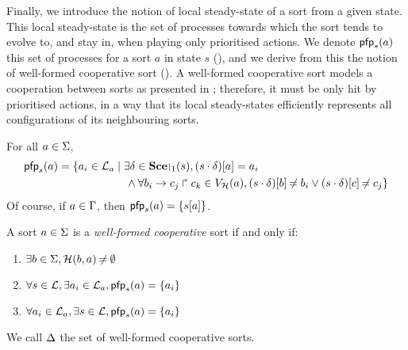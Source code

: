 Finally, we introduce the notion of local steady-state of a sort from a given state.
This local steady-state is the set of processes towards which the sort tends to evolve to, and stay in, when playing only prioritised actions.
We denote $\mathsf{pfp}_s(a)$ this set of processes for a sort $a$ in state $s$ (),
and we derive from this the notion of well-formed cooperative sort ().
A well-formed cooperative sort models a cooperation between sorts as presented in ;
therefore, it must be only hit by prioritised actions,
in a way that its local steady-states efficiently represents all configurations of its neighbouring sorts.
\begin{definition}[$\pfp : \PHs \rightarrow \powerset(\PHproc)$]
\label{def:pfp}
  For all $a \in \Sigma$,
  \begin{align*}
    \pfp_s(a) = \{ a_i \in \PHl_a &\mid \exists \delta \in \restriction{\Sce}{1}(s), \PHget{(s \PHplay \delta)}{a} = a_i \\
    & \quad \wedge \forall \PHhit{b_i}{c_j}{c_k} \in \Vh(a), \PHget{(s \PHplay \delta)}{b} \neq b_i \vee \PHget{(s \PHplay \delta)}{c} \neq c_j \}
  \end{align*}
  Of course, if $a \in \Gamma$, then $\mathsf{pfp}_s(a) = \{ {s[a]} \}$.
\end{definition}
%
\begin{definition}
\label{def:cs}
  A sort $a \in \Sigma$ is a \emph{well-formed cooperative} sort if and only if:
  \begin{enumerate}
    \item $\exists b \in \Sigma, \mathcal{H}(b, a) \not\nobreak\mkern -2mu = \emptyset$
    \item \label{csai} $\forall s \in \mathcal{L}, \exists a_i \in \mathcal{L}_a, \mathsf{pfp}_s(a) = \{ a_i \}$
    \item \label{css} $\forall a_i \in \mathcal{L}_a, \exists s \in \mathcal{L}, \mathsf{pfp}_s(a) = \{ a_i \}$
  \end{enumerate}
  We call $\Delta$ the set of well-formed cooperative sorts.
\end{definition}

